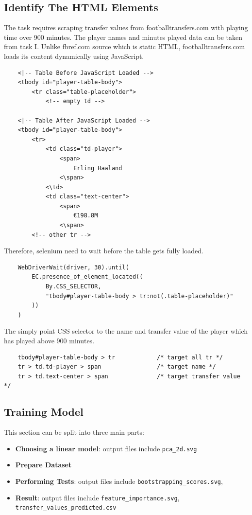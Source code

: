 \documentclass{report}
\begin{document}
\subsection{Identify The HTML Elements}
The task requires scraping transfer values from footballtransfers.com with playing time over 900 
minutes. The player names and minutes played data can be taken from task I. Unlike fbref.com 
source which is static HTML, footballtransfers.com loads its content dynamically using JavaScript.
\begin{verbatim}
    <|-- Table Before JavaScript Loaded -->
    <tbody id="player-table-body">
        <tr class="table-placeholder">
            <!-- empty td -->

    <|-- Table After JavaScript Loaded -->
    <tbody id="player-table-body">
        <tr>
            <td class="td-player">
                <span>
                    Erling Haaland
                <\span>
            <\td>
            <td class="text-center">
                <span>
                    €198.8M
                <\span>
        <!-- other tr -->
\end{verbatim}

\noindent
Therefore, selenium need to wait before the table gets fully loaded.
\begin{verbatim}
    WebDriverWait(driver, 30).until(
        EC.presence_of_element_located((
            By.CSS_SELECTOR, 
            "tbody#player-table-body > tr:not(.table-placeholder)"
        ))
    )
\end{verbatim}

\noindent
The simply point CSS selector to the name and transfer value of the player which has played
above 900 minutes.
\begin{verbatim}
    tbody#player-table-body > tr            /* target all tr */
    tr > td.td-player > span                /* target name */
    tr > td.text-center > span              /* target transfer value */ 
\end{verbatim}

\subsection{Training Model}
This section can be split into three main parts:
\begin{itemize}
    \item \textbf{Choosing a linear model}: output files include \verb|pca_2d.svg|
    \item \textbf{Prepare Dataset} 
    \item \textbf{Performing Tests}: output files include \verb|bootstrapping_scores.svg|,
    \item \textbf{Result}: output files include \verb|feature_importance.svg|, 
    \verb|transfer_values_predicted.csv|
\end{itemize}
\end{document}
